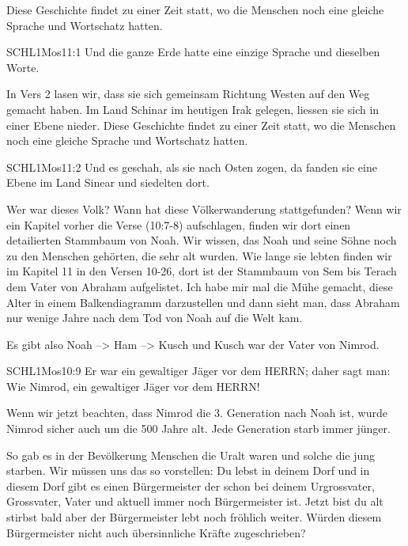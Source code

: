 \documentclass[14pt]{../../inc/mybib}
\newenvironment{block}[1][]{%
  \vspace{1.5em}%
  \noindent\textbf{#1}\par%
  \vspace{0.0em}%
}{%
  \vspace{1em}%
}
\begin{document}
    \begin{block}
    Diese Geschichte findet zu einer Zeit statt, wo die Menschen noch eine gleiche Sprache und Wortschatz hatten.
    \begin{bibelbox}{SCHL}{1Mos}{11:1}
        Und die ganze Erde hatte eine einzige Sprache und dieselben Worte.
    \end{bibelbox}    
    In Vers 2 lasen wir, dass sie sich gemeinsam Richtung Westen auf den Weg gemacht haben. Im Land Schinar im heutigen Irak gelegen, liessen sie sich in einer Ebene nieder.
    Diese Geschichte findet zu einer Zeit statt, wo die Menschen noch eine gleiche Sprache und Wortschatz hatten.
    \begin{bibelbox}{SCHL}{1Mos}{11:2}
        Und es geschah, als sie nach Osten zogen, da fanden sie eine Ebene im Land Sinear und siedelten dort.
    \end{bibelbox}
    Wer war dieses Volk? Wann hat diese Völkerwanderung stattgefunden? Wenn wir ein Kapitel vorher die Verse   (10:7-8) aufschlagen, finden wir dort einen detailierten Stammbaum von Noah. Wir wissen, das Noah und seine Söhne noch zu den Menschen gehörten, die sehr alt wurden. Wie lange sie lebten finden wir im Kapitel 11 in den Versen 10-26, dort ist der Stammbaum von Sem bis Terach dem Vater von Abraham aufgelistet. Ich habe mir mal die Mühe gemacht, diese Alter in einem Balkendiagramm darzustellen und dann sieht man, dass Abraham nur wenige Jahre nach dem Tod von Noah auf die Welt kam. 

    
    
    Es gibt also Noah --> Ham --> Kusch und Kusch war der Vater von Nimrod.
    \begin{bibelbox}{SCHL}{1Mos}{10:9}
        Er war ein gewaltiger Jäger vor dem HERRN; daher sagt man: Wie Nimrod, ein gewaltiger Jäger vor dem HERRN!
    \end{bibelbox}
    Wenn wir jetzt beachten, dass Nimrod die 3. Generation nach Noah ist, wurde Nimrod sicher auch um die 500 Jahre alt. Jede Generation starb immer jünger. 
\end{block}
\begin{block}
    So gab es in der Bevölkerung Menschen die Uralt waren und solche die jung starben. Wir müssen uns das so vorstellen:  Du lebst in deinem Dorf und in diesem Dorf gibt es einen Bürgermeister der schon bei deinem Urgrossvater, Grossvater, Vater und aktuell immer noch Bürgermeister ist. Jetzt bist du alt stirbst bald aber der Bürgermeister lebt noch fröhlich weiter. Würden diesem Bürgermeister nicht auch übersinnliche Kräfte zugeschrieben? 
\end{block}
\end{document}
